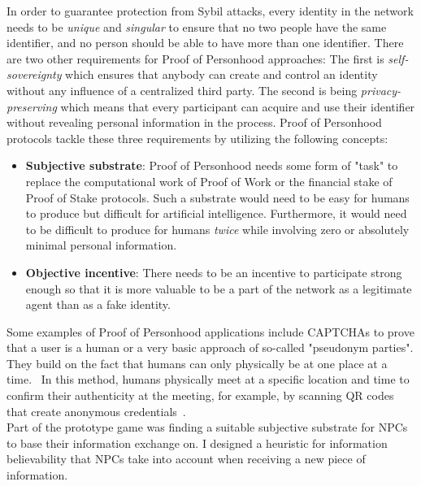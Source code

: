 In order to guarantee protection from Sybil attacks, every identity in the network needs to be \textit{unique} and \textit{singular} to ensure that no two people have the same identifier, and no person should be able to have more than one identifier. There are two other requirements for Proof of Personhood approaches: The first is \textit{self-sovereignty} which ensures that anybody can create and control an identity without any influence of a centralized third party. The second is being \textit{privacy-preserving} which means that every participant can acquire and use their identifier without revealing personal information in the process. Proof of Personhood protocols tackle these three requirements by utilizing the following concepts:
\begin{itemize}
	\item \textbf{Subjective substrate}: Proof of Personhood needs some form of "task" to replace the computational work of Proof of Work or the financial stake of Proof of Stake protocols. Such a substrate would need to be easy for humans to produce but difficult for artificial intelligence. Furthermore, it would need to be difficult to produce for humans \textit{twice} while involving zero or absolutely minimal personal information.
	\item \textbf{Objective incentive}: There needs to be an incentive to participate strong enough so that it is more valuable to be a part of the network as a legitimate agent than as a fake identity.
\end{itemize}
Some examples of Proof of Personhood applications include CAPTCHAs to prove that a user is a human or a very basic approach of so-called "pseudonym parties". They build on the fact that humans can only physically be at one place at a time.~\cite{Siddarth2020} In this method, humans physically meet at a specific location and time to confirm their authenticity at the meeting, for example, by scanning QR codes that create anonymous credentials~\cite{Borge2017}.\\
Part of the prototype game was finding a suitable subjective substrate for NPCs to base their information exchange on. I designed a heuristic for information believability that NPCs take into account when receiving a new piece of information.
